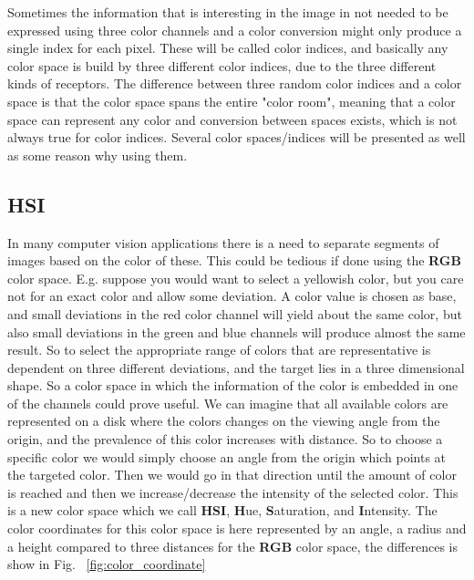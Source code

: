 Sometimes the information that is interesting in the image in not needed to be expressed using three color channels and a color conversion might only produce a single index for each pixel. These will be called color indices, and basically any color space is build by three different color indices, due to the three different kinds of receptors. The difference between three random color indices and a color space is that the color space spans the entire "color room", meaning that a color space can represent any color and conversion between spaces exists, which is not always true for color indices. Several color spaces/indices will be presented as well as some reason why using them.

\subsection{HSI}

In many computer vision applications there is a need to separate segments of images based on the color of these. This could be tedious if done using the \textbf{RGB} color space. E.g. suppose you would want to select a yellowish color, but you care not for an exact color and allow some deviation. A color value is chosen as base, and small deviations in the red color channel will yield about the same color, but also small deviations in the green and blue channels will produce almost the same result. So to select the appropriate range of colors that are representative is dependent on three different deviations, and the target lies in a three dimensional shape. So a color space in which the information of the color is embedded in one of the channels could prove useful.  We can imagine that all available colors are represented on a disk where the colors changes on the viewing angle from the origin, and the prevalence of this color increases with distance. So to choose a specific color we would simply choose an angle from the origin which points at the targeted color. Then we would go in that direction until the amount of color is reached and then we increase/decrease the intensity of the selected color. This is a new color space which we call \textbf{HSI}, \textbf{H}ue, \textbf{S}aturation, and \textbf{I}ntensity. The color coordinates for this color space is here represented by an angle, a radius and a height compared to three distances for the \textbf{RGB} color space, the differences is show in Fig. ~\ref{fig:color_coordinate}

